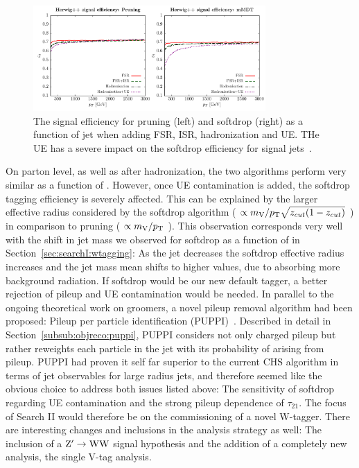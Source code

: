 \begin{figure}[h!]
\centering
\includegraphics[width=0.79\textwidth]{figures/analysis/search2/misc/pruningvssd_ue.pdf}
\caption{The signal efficiency for pruning (left) and softdrop (right) as a function of jet \PT when adding FSR, ISR, hadronization and UE. THe UE has a severe impact on the softdrop efficiency for signal jets~\cite{Dasgupta:2015yua}. }
\label{fig:searchII:ue}
\end{figure}
On parton level, as well as after hadronization, the two algorithms perform very similar as a function of \PT. However, once UE contamination is added, the softdrop tagging efficiency is severely affected. This can be explained by the larger effective radius considered by the softdrop algorithm ( $\propto m_{\mathrm{V}}/p_{\mathrm{T}} \sqrt{z_{cut}(1-z_{cut})}$ ) in comparison to pruning ( $\propto m_{\mathrm{V}}/p_{\mathrm{T}}$ ). This observation corresponds very well with the shift in jet mass we observed for softdrop as a function of \PT in Section~\ref{sec:searchI:wtagging}: As the jet \PT decreases the softdrop effective radius increases and the jet mass mean shifts to higher values, due to absorbing more background radiation. If softdrop would be our new default tagger, a better rejection of pileup and UE contamination would be needed. In parallel to the ongoing theoretical work on groomers, a novel pileup removal algorithm had been proposed: Pileup per particle identification (PUPPI)~\cite{Bertolini2014}. Described in detail in Section~\ref{subsub:objreco:puppi}, PUPPI considers not only charged pileup but rather reweights each particle in the jet with its probability of arising from pileup. PUPPI had proven it self far superior to the current CHS algorithm in terms of jet observables for large radius jets, and therefore seemed like the obvious choice to address both issues listed above: The sensitivity of softdrop regarding UE contamination and the strong pileup dependence of $\tau_{21}$. The focus of Search II would therefore be on the commissioning of a novel W-tagger. There are interesting changes and inclusions in the analysis strategy as well: The inclusion of a $\mathrm{Z}^\prime \rightarrow \mathrm{W}\mathrm{W}$ signal hypothesis and the addition of a completely new analysis, the single V-tag analysis.

